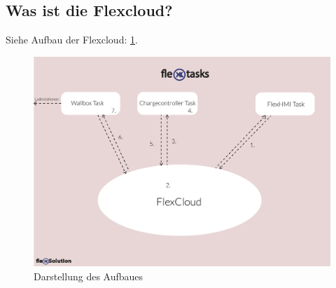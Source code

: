 \subsection{Was ist die Flexcloud?} 

Siehe Aufbau der Flexcloud: \ref{fig:impl:FlexcloudAnsicht}.

  \begin{figure}[h t]
    \centering
    \includegraphics[scale=0.5]{pics/flexTasks2.png}
    \caption{Darstellung des Aufbaues}
    \label{fig:impl:FlexcloudAnsicht}
\end{figure}

